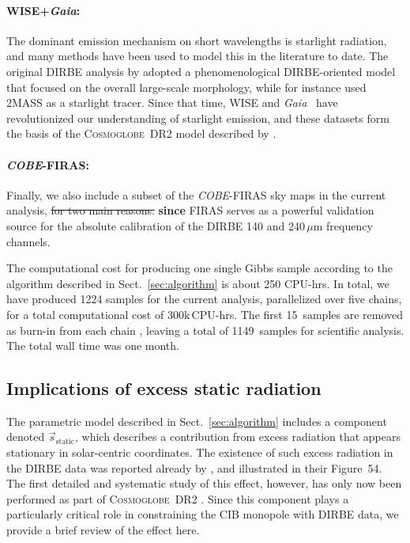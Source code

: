 \documentclass{aa}
\def\Gaia{\textit{Gaia}}
\newcommand{\s}[0]{\vec{s}}
\newcommand{\cosmoglobe}{\textsc{Cosmoglobe}}
\def\COBE{\textit{COBE}}
\def\Gaia{\textit{Gaia}}
\def\WISE{WISE}
\begin{document}
  \paragraph{\WISE+\textit{Gaia}:} The dominant emission mechanism on short
  wavelengths is starlight radiation, and many methods have been used
  to model this in the literature to date. The original DIRBE analysis
  by \citet{arendt1998} adopted a phenomenological DIRBE-oriented
  model that focused on the overall large-scale morphology, while for
  instance \citet{wright:2001} used 2MASS as a starlight tracer. Since
  that time, WISE \citep{wright:2010} and \Gaia\ \citep{gaia:2016} have revolutionized our understanding of
  starlight emission, and these datasets form the basis of the
  \cosmoglobe\ DR2 model described by \citet{CG02_04}.

  \paragraph{\COBE-FIRAS:} Finally, we also include a subset of the
  \COBE-FIRAS \citep{mather:1994} sky maps in the current analysis, \sout{for two main
  reasons.} \textbf{since} FIRAS serves as a powerful validation source for
  the absolute calibration of the DIRBE 140 and 240\,$\mu\mathrm{m}$
  frequency channels. 

The computational cost for producing one single Gibbs sample according
to the algorithm described in Sect.~\ref{sec:algorithm} is about
250 CPU-hrs. In
total, we have produced 1224 samples for the current analysis,
parallelized over five chains, for a total computational cost of
300k\,CPU-hrs. The first 15~samples are removed as burn-in from each
chain \citep{CG02_02}, leaving a total of 1149~samples for scientific
analysis. The total wall time was one month.


\subsection{Implications of excess static radiation}
\label{sec:excessrad}

The parametric model described in Sect.~\ref{sec:algorithm} includes a
component denoted $\s_{\mathrm{static}}$, which describes a
contribution from excess radiation that appears stationary in
solar-centric coordinates. The existence of such excess radiation in
the DIRBE data was reported already by \citet{leinert:1998}, and
illustrated in their Figure~54. The first detailed and systematic
study of this effect, however, has only now been performed as part of
\cosmoglobe\ DR2 \citep{CG02_01}. Since this component plays a
particularly critical role in constraining the CIB monopole with DIRBE
data, we provide a brief review of the effect here.
\end{document}
